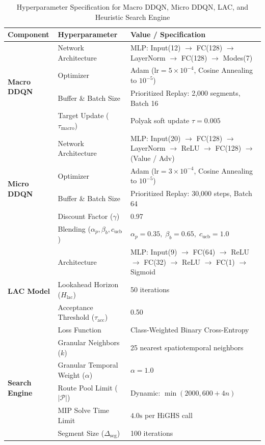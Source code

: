 \begin{table}[!t]
\caption{Hyperparameter Specification for Macro DDQN, Micro DDQN, LAC, and Heuristic Search Engine}
\label{tab:hyperparameters}
\centering
\footnotesize
\begin{tabularx}{\columnwidth}{l l X}
\toprule
\textbf{Component} & \textbf{Hyperparameter} & \textbf{Value / Specification} \\
\midrule
\multirow{4}{*}{\textbf{Macro DDQN}} 
  & Network Architecture & MLP: Input(12) $\to$ FC(128) $\to$ LayerNorm $\to$ FC(128) $\to$ Modes(7) \\
  & Optimizer & Adam ($\text{lr} = 5 \times 10^{-4}$, Cosine Annealing to $10^{-5}$) \\
  & Buffer \& Batch Size & Prioritized Replay: 2,000 segments, Batch 16 \\
  & Target Update ($\tau_{\text{macro}}$) & Polyak soft update $\tau = 0.005$ \\
\midrule
\multirow{5}{*}{\textbf{Micro DDQN}} 
  & Network Architecture & MLP: Input(20) $\to$ FC(128) $\to$ LayerNorm $\to$ ReLU $\to$ FC(128) $\to$ (Value / Adv) \\
  & Optimizer & Adam ($\text{lr} = 3 \times 10^{-4}$, Cosine Annealing to $10^{-5}$) \\
  & Buffer \& Batch Size & Prioritized Replay: 30,000 steps, Batch 64 \\
  & Discount Factor ($\gamma$) & 0.97 \\
  & Blending ($\alpha_p, \beta_b, c_{\text{ucb}}$) & $\alpha_p = 0.35, \; \beta_b = 0.65, \; c_{\text{ucb}} = 1.0$ \\
\midrule
\multirow{4}{*}{\textbf{LAC Model}} 
  & Architecture & MLP: Input(9) $\to$ FC(64) $\to$ ReLU $\to$ FC(32) $\to$ ReLU $\to$ FC(1) $\to$ Sigmoid \\
  & Lookahead Horizon ($H_{\text{lac}}$) & 50 iterations \\
  & Acceptance Threshold ($\tau_{\text{acc}}$) & 0.50 \\
  & Loss Function & Class-Weighted Binary Cross-Entropy \\
\midrule
\multirow{5}{*}{\textbf{Search Engine}} 
  & Granular Neighbors ($k$) & 25 nearest spatiotemporal neighbors \\
  & Granular Temporal Weight ($\alpha$) & $\alpha = 1.0$ \\
  & Route Pool Limit ($|\mathcal{P}|$) & Dynamic: $\min(2000, 600 + 4n)$ \\
  & MIP Solve Time Limit & $4.0\text{s}$ per HiGHS call \\
  & Segment Size ($\Delta_{\text{seg}}$) & 100 iterations \\
\bottomrule
\end{tabularx}
\end{table}

